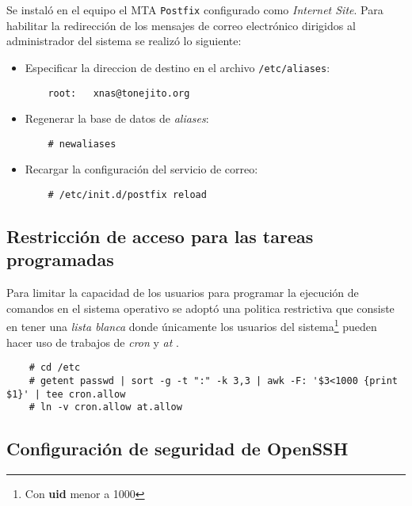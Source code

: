 Se instal\'{o} en el equipo el \textsc{MTA} \texttt{Postfix} configurado como \textit{Internet Site}. Para habilitar la redirecci\'{o}n de los mensajes de correo electr\'{o}nico dirigidos al administrador del sistema se realiz\'{o} lo siguiente:

\begin{itemize}
  \item Especificar la direccion de destino en el archivo \texttt{/etc/aliases}:

{
\scriptsize
\linespread{1}
\begin{verbatim}
    root:	xnas@tonejito.org
\end{verbatim}
}

  \item Regenerar la base de datos de \textit{aliases}:

{
\scriptsize
\linespread{1}
\begin{verbatim}
    # newaliases
\end{verbatim}
}

  \item Recargar la configuraci\'{o}n del servicio de correo:

{
\scriptsize
\linespread{1}
\begin{verbatim}
    # /etc/init.d/postfix reload
\end{verbatim}
}

\end{itemize}

      \subsection {Restricci\'{o}n de acceso para las tareas programadas}

Para limitar la capacidad de los usuarios para programar la ejecuci\'{o}n de comandos en el sistema operativo se adopt\'{o} una politica restrictiva que consiste en tener una \textit{lista blanca} donde \'{u}nicamente los usuarios del sistema\footnote{Con \textbf{uid} menor a 1000} pueden hacer uso de trabajos de \textsl{cron} y \textsl{at} \cite{_debian_????-1} \cite{_crontab_????} \cite{_at_????}.

{
\scriptsize
\linespread{1}
\begin{verbatim}
    # cd /etc
    # getent passwd | sort -g -t ":" -k 3,3 | awk -F: '$3<1000 {print $1}' | tee cron.allow
    # ln -v cron.allow at.allow
\end{verbatim}
}

      \subsection {Configuraci\'{o}n de seguridad de \textup{OpenSSH}}

